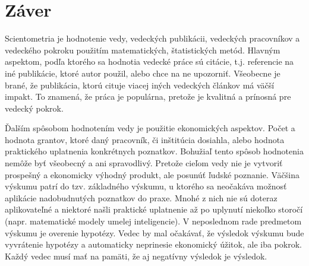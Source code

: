 \chapter*{Záver}

Scientometria je hodnotenie vedy, vedeckých publikácii, vedeckých pracovníkov a
vedeckého pokroku použitím matematických, štatistických metód.  Hlavným
aspektom, podľa ktorého sa hodnotia vedecké práce sú citácie, t.j. referencie na
iné publikácie, ktoré autor použil, alebo chce na ne upozorniť.  Všeobecne je
brané, že publikácia, ktorú cituje viacej iných vedeckých článkov má väčší
impakt.  To znamená, že práca je populárna, pretože je kvalitná a prínosná pre
vedecký pokrok.

Ďalším spôsobom hodnotením vedy je použitie ekonomických aspektov.  Počet a
hodnota grantov, ktoré daný pracovník, či inštitúcia dosiahla, alebo hodnota
praktického uplatnenia konkrétnych poznatkov.  Bohužiaľ tento spôsob hodnotenia
nemôže byť všeobecný a ani spravodlivý.  Pretože cieľom vedy nie je vytvoriť
prospešný a ekonomicky výhodný produkt, ale posunúť ľudské poznanie.  Väčšina
výskumu patrí do tzv. základného výskumu, u ktorého sa neočakáva možnosť
aplikácie nadobudnutých poznatkov do praxe.  Mnohé z nich nie sú doteraz
aplikovateľné a niektoré našli praktické uplatnenie až po uplynutí niekoľko
storočí (napr. matematické modely umelej inteligencie).  V neposlednom rade
predmetom výskumu je overenie hypotézy.  Vedec by mal očakávať, že výsledok
výskumu bude vyvrátenie hypotézy a automaticky neprinesie ekonomický úžitok, ale
iba pokrok.  Každý vedec musí mať na pamäti, že aj negatívny výsledok je
výsledok.

